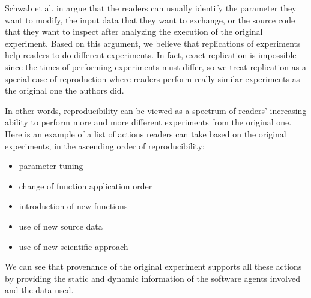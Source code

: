 Schwab et al. in \cite{schwab2000making} argue that the readers can usually identify the parameter 
they want to modify, the input data that they want to exchange, or the source code that they want to 
inspect after analyzing the execution of the original experiment. Based on this argument, we believe 
that replications of experiments help readers to do different experiments. In fact, exact replication 
is impossible since the times of performing experiments must differ, so we treat replication as a 
special case of reproduction where readers perform really similar experiments as the original one the 
authors did.

In other words, reproducibility can be viewed as a spectrum of readers' increasing ability to perform 
more and more different experiments from the original one. Here is an example of a list of actions 
readers can take based on the original experiments, in the ascending order of reproducibility:
\begin{itemize}
\item parameter tuning
\item change of function application order
\item introduction of new functions
\item use of new source data
\item use of new scientific approach
\end{itemize}
We can see that provenance of the original experiment supports all these actions by providing the 
static and dynamic information of the software agents involved and the data used.


